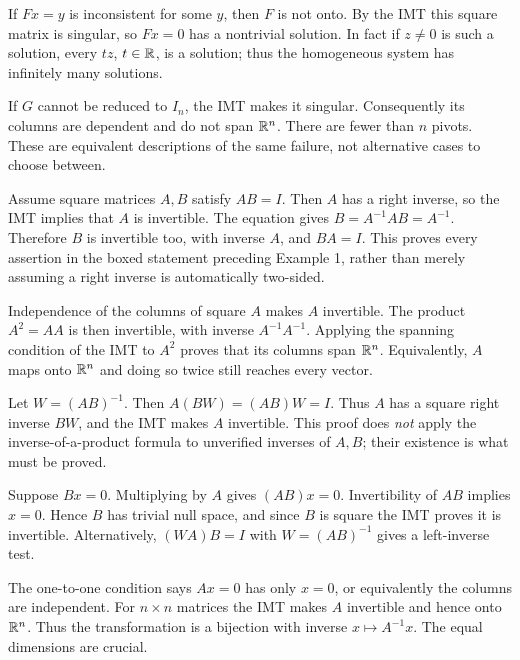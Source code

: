 If $Fx=y$ is inconsistent for some $y$, then $F$ is not onto.
By the IMT this square matrix is singular, so $Fx=0$ has a nontrivial
solution. In fact if $z\ne0$ is such a solution, every $tz$, $t\in\mathbb{R}$,
is a solution; thus the homogeneous system has infinitely many solutions.

If $G$ cannot be reduced to $I_n$, the IMT makes it singular.
Consequently its columns are dependent and do not span $\mathbb{R}^n$.
There are fewer than $n$ pivots. These are equivalent descriptions of the
same failure, not alternative cases to choose between.

Assume square matrices $A,B$ satisfy $AB=I$. Then $A$ has a right
inverse, so the IMT implies that $A$ is invertible. The equation gives
$B=A^{-1}AB=A^{-1}$. Therefore $B$ is invertible too, with inverse $A$,
and $BA=I$. This proves every assertion in the boxed statement preceding
Example 1, rather than merely assuming a right inverse is automatically two-sided.

Independence of the columns of square $A$ makes $A$ invertible.
The product $A^2=AA$ is then invertible, with inverse $A^{-1}A^{-1}$.
Applying the spanning condition of the IMT to $A^2$ proves that its columns
span $\mathbb{R}^n$. Equivalently, $A$ maps onto $\mathbb{R}^n$ and doing so twice
still reaches every vector.

Let $W=(AB)^{-1}$. Then $A(BW)=(AB)W=I$.
Thus $A$ has a square right inverse $BW$, and the IMT makes $A$
invertible. This proof does \emph{not} apply the inverse-of-a-product
formula to unverified inverses of $A,B$; their existence is what must be proved.

Suppose $Bx=0$. Multiplying by $A$ gives $(AB)x=0$.
Invertibility of $AB$ implies $x=0$. Hence $B$ has trivial null space,
and since $B$ is square the IMT proves it is invertible.
Alternatively, $(WA)B=I$ with $W=(AB)^{-1}$ gives a left-inverse test.

The one-to-one condition says $Ax=0$ has only $x=0$, or equivalently the
columns are independent. For $n\times n$ matrices the IMT makes $A$
invertible and hence onto $\mathbb{R}^n$. Thus the transformation is a bijection
with inverse $x\mapsto A^{-1}x$. The equal dimensions are crucial.

